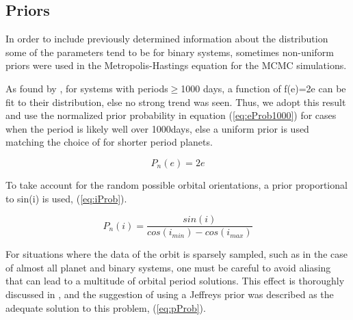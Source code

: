\documentclass[10pt,preprint]{aastex}
\begin{document}


\pagebreak

\subsection{Priors}

In order to include previously determined information about the distribution some of the parameters tend to be for binary systems, sometimes non-uniform priors were used in the Metropolis-Hastings equation for the MCMC simulations.

As found by \citet{duquennoy1991}, for systems with periods$\geq$1000 days, a function of f(e)=2e can be fit to their distribution, else no strong trend was seen.  Thus, we adopt this result and use the normalized prior probability in equation (\ref{eq:eProb1000}) for cases when the period is likely well over 1000days, else a uniform prior is used matching the choice of \citet{gregory2005} for shorter period planets.

\begin{equation}\label{eq:eProb1000}
P_n(e) =  2e
\end{equation}

 
To take account for the random possible orbital orientations, a prior proportional to sin(i) is used, (\ref{eq:iProb}).

\begin{equation}\label{eq:iProb}
P_n(i) =  \frac{sin(i)}{cos(i_{min})-cos(i_{max})}
\end{equation}

For situations where the data of the orbit is sparsely sampled, such as in the case of almost all planet and binary systems, one must be careful to avoid aliasing that can lead to a multitude of orbital period solutions.  This effect is thoroughly discussed in \citet{gregory2005}, and the suggestion of using a Jeffreys prior was described as the adequate solution to this problem, (\ref{eq:pProb}).
\end{document}

